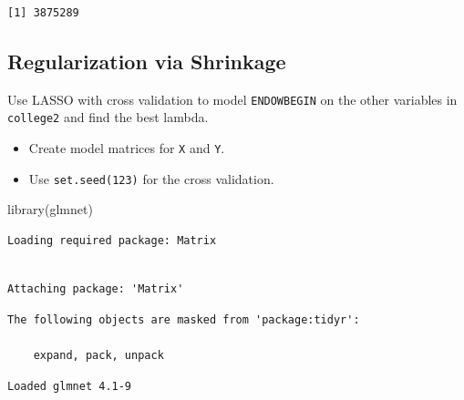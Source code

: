 \documentclass[
  letterpaper,
  DIV=11,
  numbers=noendperiod]{scrartcl}
\newenvironment{Shaded}{\begin{snugshade}}{\end{snugshade}}
\newcommand{\DecValTok}[1]{\textcolor[rgb]{0.68,0.00,0.00}{#1}}
\newcommand{\FunctionTok}[1]{\textcolor[rgb]{0.28,0.35,0.67}{#1}}
\newcommand{\NormalTok}[1]{\textcolor[rgb]{0.00,0.23,0.31}{#1}}
\newcommand{\OtherTok}[1]{\textcolor[rgb]{0.00,0.23,0.31}{#1}}
\newcommand{\SpecialCharTok}[1]{\textcolor[rgb]{0.37,0.37,0.37}{#1}}
\providecommand{\tightlist}{%
  \setlength{\itemsep}{0pt}\setlength{\parskip}{0pt}}\usepackage{longtable,booktabs,array}
\begin{document}
\begin{verbatim}
[1] 3875289
\end{verbatim}

\subsection{Regularization via
Shrinkage}\label{regularization-via-shrinkage}

Use LASSO with cross validation to model \texttt{ENDOWBEGIN} on the
other variables in \texttt{college2} and find the best lambda.

\begin{itemize}
\tightlist
\item
  Create model matrices for \texttt{X} and \texttt{Y}.
\item
  Use \texttt{set.seed(123)} for the cross validation.
\end{itemize}

\begin{Shaded}
\begin{Highlighting}[]
\FunctionTok{library}\NormalTok{(glmnet)}
\end{Highlighting}
\end{Shaded}

\begin{verbatim}
Loading required package: Matrix
\end{verbatim}

\begin{verbatim}

Attaching package: 'Matrix'
\end{verbatim}

\begin{verbatim}
The following objects are masked from 'package:tidyr':

    expand, pack, unpack
\end{verbatim}

\begin{verbatim}
Loaded glmnet 4.1-9
\end{verbatim}

\begin{Shaded}
\end{Shaded}
\end{document}

